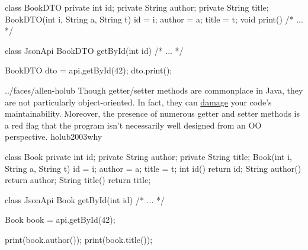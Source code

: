 \documentclass{article}
\begin{document}
\begin{lnSnippet}
class BookDTO {
  private int id;
  private String author;
  private String title;
  BookDTO(int i, String a, String t)
    { id = i; author = a; title = t; }
  void print() { /* ... */ }
}
\end{lnSnippet}
\begin{lnSnippet}
class JsonApi {
  BookDTO getById(int id) { /* ... */ }
}

BookDTO dto = api.getById(42);
dto.print();
\end{lnSnippet}

\lnQuote
  {../faces/allen-holub}
  {Though getter/setter methods are commonplace in Java, they are not particularly object-oriented. In fact, they can \ul{damage} your code's maintainability. Moreover, the presence of numerous getter and setter methods is a red flag that the program isn't necessarily well designed from an OO perspective.}
  {holub2003why}

\begin{lnSnippet}
class Book {
  private int id;
  private String author;
  private String title;
  Book(int i, String a, String t)
    { id = i; author = a; title = t; }
  int id() { return id; }
  String author() { return author; }
  String title() { return title; }
}
\end{lnSnippet}
\begin{lnSnippet}
class JsonApi {
  Book getById(int id) { /* ... */ }
}

Book book = api.getById(42);

print(book.author());
print(book.title());
\end{lnSnippet}
\end{document}
